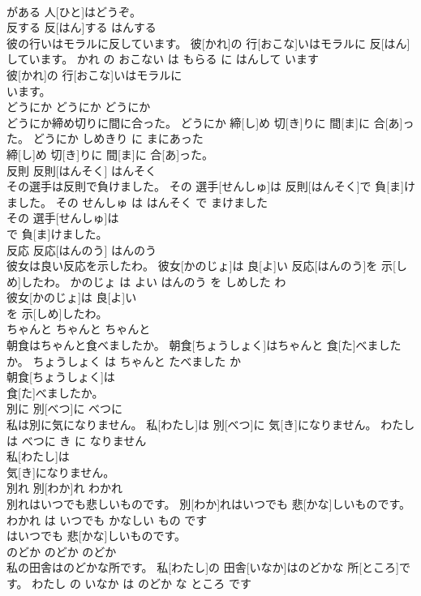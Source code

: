 \documentclass[8pt]{extreport}
\begin{document}
\begin{CJK}{UTF8}{min}
\\	がある 人[ひと]はどうぞ。			
\\	反する	反[はん]する	はんする	
\\	彼の行いはモラルに反しています。	彼[かれ]の 行[おこな]いはモラルに 反[はん]しています。	かれ の おこない は もらる に はんして います	
\\	彼[かれ]の 行[おこな]いはモラルに
\\	います。			
\\	どうにか	どうにか	どうにか	
\\	どうにか締め切りに間に合った。	どうにか 締[し]め 切[き]りに 間[ま]に 合[あ]った。	どうにか しめきり に まにあった	
\\	締[し]め 切[き]りに 間[ま]に 合[あ]った。			
\\	反則	反則[はんそく]	はんそく	
\\	その選手は反則で負けました。	その 選手[せんしゅ]は 反則[はんそく]で 負[ま]けました。	その せんしゅ は はんそく で まけました	
\\	その 選手[せんしゅ]は
\\	で 負[ま]けました。			
\\	反応	反応[はんのう]	はんのう	
\\	彼女は良い反応を示したわ。	彼女[かのじょ]は 良[よ]い 反応[はんのう]を 示[しめ]したわ。	かのじょ は よい はんのう を しめした わ	
\\	彼女[かのじょ]は 良[よ]い
\\	を 示[しめ]したわ。			
\\	ちゃんと	ちゃんと	ちゃんと	
\\	朝食はちゃんと食べましたか。	朝食[ちょうしょく]はちゃんと 食[た]べましたか。	ちょうしょく は ちゃんと たべました か	
\\	朝食[ちょうしょく]は
\\	食[た]べましたか。			
\\	別に	別[べつ]に	べつに	
\\	私は別に気になりません。	私[わたし]は 別[べつ]に 気[き]になりません。	わたし は べつに き に なりません	
\\	私[わたし]は
\\	気[き]になりません。			
\\	別れ	別[わか]れ	わかれ	
\\	別れはいつでも悲しいものです。	別[わか]れはいつでも 悲[かな]しいものです。	わかれ は いつでも かなしい もの です	
\\	はいつでも 悲[かな]しいものです。			
\\	のどか	のどか	のどか	
\\	私の田舎はのどかな所です。	私[わたし]の 田舎[いなか]はのどかな 所[ところ]です。	わたし の いなか は のどか な ところ です	

\end{CJK}
\end{document}
